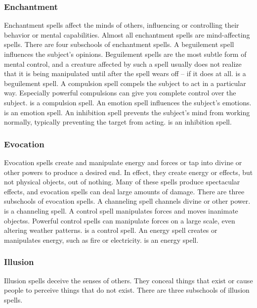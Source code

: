 \subsubsection{Enchantment}
Enchantment spells affect the minds of others, influencing or controlling their behavior or mental capabilities. Almost all enchantment spells are mind-affecting spells. There are four subschools of enchantment spells.
 A beguilement spell influences the subject's opinions. Beguilement spells are the most subtle form of mental control, and a creature affected by such a spell usually does not realize that it is being manipulated until after the spell wears off -- if it does at all.  is a beguilement spell.
 A compulsion spell compels the subject to act in a particular way. Especially powerful compulsions can give you complete control over the subject.  is a compulsion spell.
 An emotion spell influences the subject's emotions.  is an emotion spell.
 An inhibition spell prevents the subject's mind from working normally, typically preventing the target from acting.  is an inhibition spell.

\subsubsection{Evocation}
Evocation spells create and manipulate energy and forces or tap into divine or other powers to produce a desired end. In effect, they create energy or effects, but not physical objects, out of nothing. Many of these spells produce spectacular effects, and evocation spells can deal large amounts of damage. There are three subschools of evocation spells.
 A channeling spell channels divine or other power.  is a channeling spell.
 A control spell manipulates forces and moves inanimate objectss. Powerful control spells can manipulate forces on a large scale, even altering weather patterns.  is a control spell.
 An energy spell creates or manipulates energy, such as fire or electricity.  is an energy spell.

\subsubsection{Illusion}
Illusion spells deceive the senses of others. They conceal things that exist or cause people to perceive things that do not exist. There are three subschools of illusion spells.

